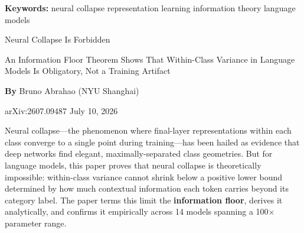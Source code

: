\documentclass[10pt,twocolumn]{article}
\begin{document}
\setlength{\parindent}{0pt}
\setlength{\parskip}{4pt}

{\small\color{keywordgray}\textbf{Keywords:}
  neural collapse \textbullet{}
  representation learning \textbullet{}
  information theory \textbullet{}
  language models}\par\vspace{4pt}

{\LARGE\bfseries\raggedright
  Neural Collapse Is Forbidden}\par\vspace{4pt}

{\large\itshape\raggedright
  An Information Floor Theorem Shows That Within-Class Variance
  in Language Models Is Obligatory, Not a Training Artifact}\par\vspace{6pt}

{\small\textbf{By} Bruno Abrahao
  (NYU Shanghai)}\par\vspace{2pt}

{\small\color{keywordgray}arXiv:2607.09487 \textbullet{}
  July 10, 2026}
\par\vspace{2pt}\noindent{\color{rulered}\rule{\columnwidth}{0.6pt}}\vspace{6pt}

Neural collapse---the phenomenon where final-layer representations
within each class converge to a single point during training---has been
hailed as evidence that deep networks find elegant, maximally-separated
class geometries. But for language models, this paper proves that
neural collapse is theoretically impossible: within-class variance
cannot shrink below a positive lower bound determined by how much
contextual information each token carries beyond its category label.
The paper terms this limit the \textbf{information floor}, derives it
analytically, and confirms it empirically across 14 models spanning
a 100$\times$ parameter range.
\end{document}
